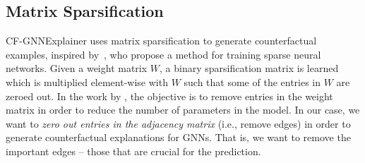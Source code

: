 \subsection{Matrix Sparsification}
\label{section:matrix-sparsification}
CF-GNNExplainer uses matrix sparsification to generate counterfactual examples, inspired by~\citet{srinivas_training_2016}, who propose a method for training sparse neural networks. 
Given a weight matrix $W$, a binary sparsification matrix is learned which is multiplied element-wise with $W$ such that some of the entries in $W$ are zeroed out. 
In the work by \citet{srinivas_training_2016}, the objective is to remove entries in the weight matrix in order to reduce the number of parameters in the model. 
In our case, we want to \emph{zero out entries in the adjacency matrix} (i.e., remove edges) in order to generate counterfactual explanations for GNNs. 
That is, we want to remove the important edges -- those that are crucial for the prediction. 